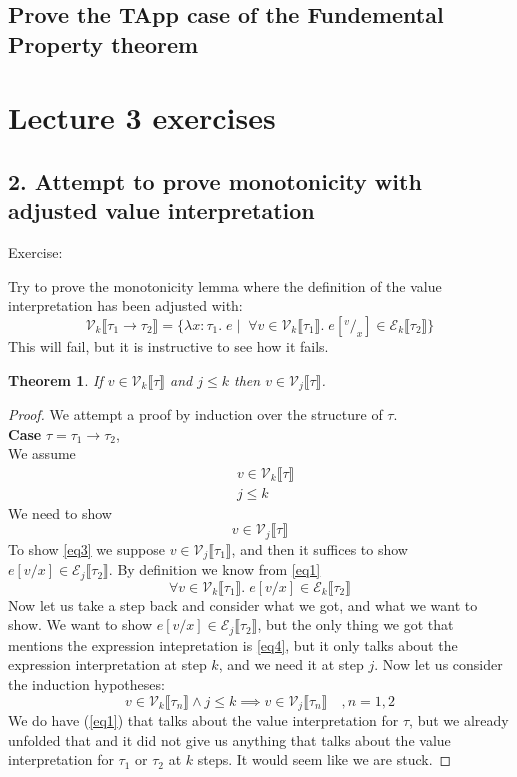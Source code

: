 \documentclass[a4paper,10pt,fleqn]{article}
\newcommand{\sem}[1]{\ensuremath{\llbracket #1 \rrbracket}}
\newcommand{\curly}[1]{\ensuremath{\mathcal{#1}}}
\newcommand{\case}[1]{~\\{\bf Case} #1,~\\}
\newcommand{\subst}[3]{\ensuremath{\ensuremath{#1[#2/#3]}}}
\newcommand{\tlabs}[3]{\ensuremath{\lambda #1 : #2 . \; #3}}
\newcommand{\vbar}{\ensuremath{\; | \;}}
\newcommand{\tarrow}[2]{\ensuremath{ #1 \rightarrow #2}}
\newcommand{\pres}[3]{\ensuremath{\curly{#1}_{#2}\sem{#3}}}
\newcommand{\epres}[2][k]{\ensuremath{\pres{E}{#1}{#2}}}
\newcommand{\vpres}[2][k]{\ensuremath{\pres{V}{#1}{#2}}}
\newcommand{\sub}[3]{\ensuremath{#1[^{#2}/_{#3}]}}
\newtheorem*{theorem}{Theorem}
\begin{document}
\subsection*{Prove the TApp case of the Fundemental Property theorem}


\section*{Lecture 3 exercises}
\subsection*{2. Attempt to prove monotonicity with adjusted value interpretation}
Exercise:
\begin{displayquote}
Try to prove the monotonicity lemma where the definition of the value interpretation has been adjusted with:
\[
\vpres{\tarrow{\tau_1}{\tau_2}} = \{\tlabs{x}{\tau_1}{e} \vbar \; \forall v \in \vpres{\tau_1}. \; \sub{e}{v}{x} \in \epres{\tau_2} \}
\]
This will fail, but it is instructive to see how it fails.
\end{displayquote}
\begin{theorem}
  If $v\in \vpres{\tau}$ and $j \leq k$  then $v \in \vpres[j]{\tau}$.
\end{theorem}
\begin{proof}\renewcommand{\qedsymbol}{$\times$}
We attempt a proof by induction over the structure of $\tau$.
\case{$\tau = \tarrow{\tau_1}{\tau_2}$} 
We assume 
\begin{align}
  & v \in \vpres{\tau} \label{eq1} \\
  & j \leq k           \nonumber 
\end{align}
We need to show 
\begin{equation}
  v\in\vpres[j]{\tau}    \label{eq3}
\end{equation}
To show \ref{eq3} we suppose $v\in \vpres[j]{\tau_1}$, and then it suffices to show $\subst{e}{v}{x} \in \epres[j]{\tau_2}$. By definition we know from \ref{eq1} 
\begin{equation}
  \forall v \in \vpres{\tau_1}.\; \subst{e}{v}{x} \in \epres{\tau_2} \label{eq4}
\end{equation}
Now let us take a step back and consider what we got, and what we want to show. We want to show $\subst{e}{v}{x} \in \epres[j]{\tau_2}$, but the only thing we got that mentions the expression intepretation is \ref{eq4}, but it only talks about the expression interpretation at step $k$, and we need it at step $j$. Now let us consider the induction hypotheses:
\begin{equation}
  v\in \vpres{\tau_n} \wedge 
  j \leq k 
  \implies v \in \vpres[j]{\tau_n}\quad, n=1,2 \nonumber
\end{equation}
We do have (\ref{eq1}) that talks about the value interpretation for $\tau$, but we already unfolded that and it did not give us anything that talks about the value interpretation for $\tau_1$ or $\tau_2$ at $k$ steps. It would seem like we are stuck.
\end{proof}
\end{document}
